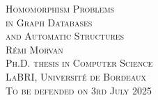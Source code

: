 \begin{titlepage}
\begin{center}
  \Huge\scshape%
  Homomorphism Problems
  \LARGE\\
  in Graph Databases\\
  and Automatic Structures\\
  \vfill
  \normalfont\LARGE{} \textsc{Rémi Morvan}\\[1em]
  \Large\scshape
  Ph.D. thesis in Computer Science\\
  \textcolor{maincolor}{LaBRI, Université de Bordeaux}\\
  \normalfont\Large\scshape To be defended on 3rd July 2025
\end{center}
\end{titlepage}
\restoregeometry